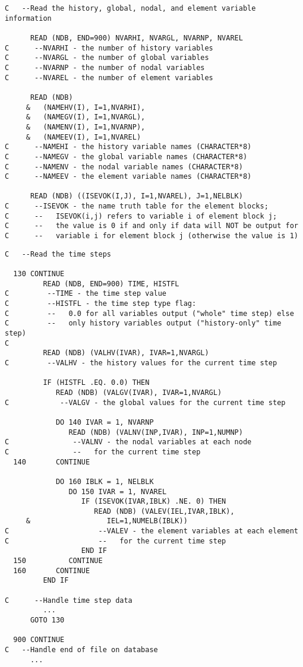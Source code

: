 \newpage
\begin{verbatim}
C   --Read the history, global, nodal, and element variable information

      READ (NDB, END=900) NVARHI, NVARGL, NVARNP, NVAREL
C      --NVARHI - the number of history variables
C      --NVARGL - the number of global variables
C      --NVARNP - the number of nodal variables
C      --NVAREL - the number of element variables

      READ (NDB)
     &   (NAMEHV(I), I=1,NVARHI),
     &   (NAMEGV(I), I=1,NVARGL),
     &   (NAMENV(I), I=1,NVARNP),
     &   (NAMEEV(I), I=1,NVAREL)
C      --NAMEHI - the history variable names (CHARACTER*8)
C      --NAMEGV - the global variable names (CHARACTER*8)
C      --NAMENV - the nodal variable names (CHARACTER*8)
C      --NAMEEV - the element variable names (CHARACTER*8)

      READ (NDB) ((ISEVOK(I,J), I=1,NVAREL), J=1,NELBLK)
C      --ISEVOK - the name truth table for the element blocks;
C      --   ISEVOK(i,j) refers to variable i of element block j;
C      --   the value is 0 if and only if data will NOT be output for
C      --   variable i for element block j (otherwise the value is 1)
\end{verbatim}
\newpage
\begin{verbatim}
C   --Read the time steps

  130 CONTINUE
         READ (NDB, END=900) TIME, HISTFL
C         --TIME - the time step value
C         --HISTFL - the time step type flag:
C         --   0.0 for all variables output ("whole" time step) else
C         --   only history variables output ("history-only" time step)
C
         READ (NDB) (VALHV(IVAR), IVAR=1,NVARGL)
C         --VALHV - the history values for the current time step

         IF (HISTFL .EQ. 0.0) THEN
            READ (NDB) (VALGV(IVAR), IVAR=1,NVARGL)
C            --VALGV - the global values for the current time step

            DO 140 IVAR = 1, NVARNP
               READ (NDB) (VALNV(INP,IVAR), INP=1,NUMNP)
C               --VALNV - the nodal variables at each node
C               --   for the current time step
  140       CONTINUE

            DO 160 IBLK = 1, NELBLK
               DO 150 IVAR = 1, NVAREL
                  IF (ISEVOK(IVAR,IBLK) .NE. 0) THEN
                     READ (NDB) (VALEV(IEL,IVAR,IBLK),
     &                  IEL=1,NUMELB(IBLK))
C                     --VALEV - the element variables at each element
C                     --   for the current time step
                  END IF
  150          CONTINUE
  160       CONTINUE
         END IF

C      --Handle time step data
         ...
      GOTO 130

  900 CONTINUE
C   --Handle end of file on database
      ...
\end{verbatim}
